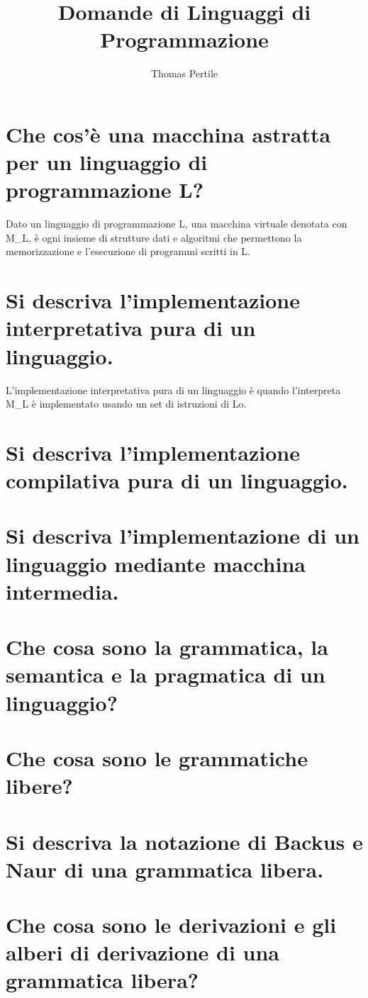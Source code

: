 \documentclass[a4paper, 10pt, italian]{article} %
\author{Thomas Pertile} %
\title{Domande di Linguaggi di Programmazione} %
\begin{document}
\maketitle %

\section{Che cos’\`{e} una macchina astratta per un linguaggio di programmazione L?} %
Dato un linguaggio di programmazione L, una macchina virtuale denotata con M_L, \`{e} ogni insieme di strutture dati e algoritmi che permettono la memorizzazione e l'esecuzione di programmi scritti in L. 

\section{Si descriva l’implementazione interpretativa pura di un linguaggio.} %
L'implementazione interpretativa pura di un linguaggio \`{e} quando l'interpreta M_L \`{e} implementato usando un set di istruzioni di Lo.

\section{Si descriva l’implementazione compilativa pura di un linguaggio.}

\section{Si descriva l’implementazione di un linguaggio mediante macchina intermedia.}

\section{Che cosa sono la grammatica, la semantica e la pragmatica di un linguaggio?}

\section{Che cosa sono le grammatiche libere?}

\section{Si descriva la notazione di Backus e Naur di una grammatica libera.}

\section{Che cosa sono le derivazioni e gli alberi di derivazione di una grammatica libera?}
\end{document}

